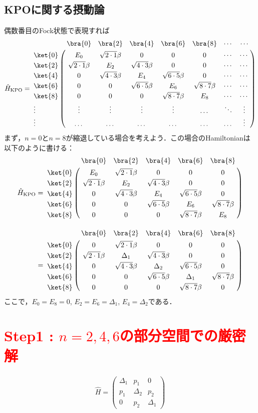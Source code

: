 \subsection{KPOに関する摂動論}
偶数番目のFock状態で表現すれば
\begin{align}
     \hat{H}_{\rm{KPO}}=
   \bordermatrix{     
    & \bra{0} &  \bra{2} &  \bra{4}&  \bra{6}&  \bra{8}& \cdots& \cdots \cr
   \ket{0}&E_0&\sqrt{2\cdot1}\beta&0&0&0&\cdots& \cdots\cr
  \ket{2}&\sqrt{2\cdot1}\beta&E_2&\sqrt{4\cdot3}\beta&0&0& \cdots& \cdots\cr
  \ket{4}&0&\sqrt{4\cdot3}\beta&E_4&\sqrt{6\cdot5}\beta&0& \cdots& \cdots\cr
  \ket{6}&0&0&\sqrt{6\cdot5}\beta&E_6&\sqrt{8\cdot7}\beta& \cdots& \cdots\cr
  \ket{8}&0&0&0&\sqrt{8\cdot7}\beta&E_8& \cdots& \cdots\cr
  \vdots&\vdots & \vdots &\vdots  & \vdots & \dots& \ddots & \vdots \cr
  \vdots&\dots & \dots&\dots &\dots & \dots& \dots  & \vdots\cr
            }
\end{align}
まず，$n=0$と$n=8$が縮退している場合を考えよう．この場合のHamiltonianは以下のように書ける：
\begin{align}
     \hat{H}_{\rm{KPO}}&=
   \bordermatrix{     
    & \bra{0} &  \bra{2} &  \bra{4}&  \bra{6}&  \bra{8}\cr
   \ket{0}&E_0&\sqrt{2\cdot1}\beta&0&0&0\cr
  \ket{2}&\sqrt{2\cdot1}\beta&E_2&\sqrt{4\cdot3}\beta&0&0\cr
  \ket{4}&0&\sqrt{4\cdot3}\beta&E_4&\sqrt{6\cdot5}\beta&0\cr
  \ket{6}&0&0&\sqrt{6\cdot5}\beta&E_6&\sqrt{8\cdot7}\beta\cr
  \ket{8}&0&0&0&\sqrt{8\cdot7}\beta&E_8\cr
            }\\[10pt]
    &=
   \bordermatrix{     
    & \bra{0} &  \bra{2} &  \bra{4}&  \bra{6}&  \bra{8}\cr
   \ket{0}&0&\sqrt{2\cdot1}\beta&0&0&0\cr
  \ket{2}&\sqrt{2\cdot1}\beta&\Delta_1&\sqrt{4\cdot3}\beta&0&0\cr
  \ket{4}&0&\sqrt{4\cdot3}\beta&\Delta_2&\sqrt{6\cdot5}\beta&0\cr
  \ket{6}&0&0&\sqrt{6\cdot5}\beta&\Delta_1&\sqrt{8\cdot7}\beta\cr
  \ket{8}&0&0&0&\sqrt{8\cdot7}\beta&0\cr
            }
\end{align}
ここで，$E_0=E_8=0$, $E_2=E_6=\Delta_1$, $E_4=\Delta_2$である．


\section*{\textcolor{red}{Step1 : $n=2,4,6$の部分空間での厳密解}}
\begin{align}
    \hat{H}=
    \left(
    \begin{array}{ccc}
    \Delta_1 & p_1 & 0 \\[5pt]
    p_1 & \Delta_2 & p_2 \\[5pt]
    0 & p_2 & \Delta_1
    \end{array}
    \right)
\end{align}


